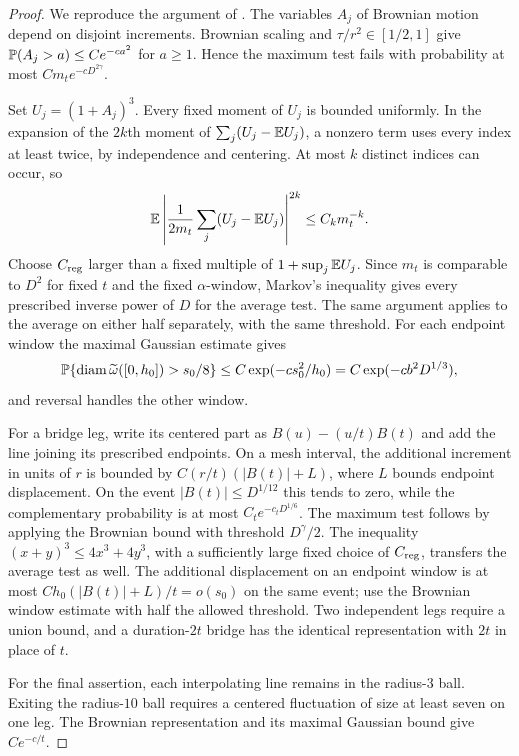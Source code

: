 \begin{proof}
We reproduce the argument of \citet[Lemma ``Free cutoff
bounds'']{HS}.  The variables $A_j$ of Brownian motion depend
on disjoint increments.  Brownian scaling and
$\tau/r^2\in[1/2,1]$ give
$\mathbb P(A_j>a)\le Ce^{-ca^2}$ for $a\ge1$.
Hence the maximum test fails with probability at most
$C m_t e^{-cD^{2\gamma}}$.

Set $U_j=(1+A_j)^3$.  Every fixed moment of $U_j$ is bounded
uniformly.  In the expansion of the $2k$th moment of
$\sum_j(U_j-\mathbb E U_j)$, a nonzero term uses every index at
least twice, by independence and centering.  At most $k$
distinct indices can occur, so
\[
 \mathbb E\left|\frac1{2m_t}\sum_j(U_j-\mathbb E U_j)\right|^{2k}
 \le C_k m_t^{-k}.
\]
Choose $C_{\rm reg}$ larger than a fixed multiple of
$1+\sup_j\mathbb E U_j$.  Since $m_t$ is comparable to $D^2$
for fixed $t$ and the fixed $\alpha$-window, Markov's
inequality gives every prescribed inverse power of $D$ for
the average test.  The same argument applies to the average
on either half separately, with the same threshold.
For each endpoint window the maximal Gaussian estimate gives
\[
 \mathbb P\{\operatorname{diam}\widetilde\omega([0,h_0])>s_0/8\}
 \le C\exp(-c s_0^2/h_0)
 =C\exp(-c b^2D^{1/3}),
\]
and reversal handles the other window.

For a bridge leg, write its centered part as
$B(u)-(u/t)B(t)$ and add the line joining its prescribed
endpoints.  On a mesh interval, the additional increment in
units of $r$ is bounded by
$C(r/t)(|B(t)|+L)$, where $L$ bounds endpoint displacement.
On the event $|B(t)|\le D^{1/12}$ this tends to zero,
while the complementary probability is at most
$C_t e^{-c_tD^{1/6}}$.  The maximum test follows by applying
the Brownian bound with threshold $D^\gamma/2$.
The inequality $(x+y)^3\le4x^3+4y^3$, with a sufficiently
large fixed choice of $C_{\rm reg}$, transfers the average
test as well.  The additional displacement on an endpoint
window is at most $C h_0(|B(t)|+L)/t=o(s_0)$ on the same
event; use the Brownian window estimate with half the allowed
threshold.  Two independent legs require a union bound, and
a duration-$2t$ bridge has the identical representation with
$2t$ in place of $t$.

For the final assertion, each interpolating line remains in
the radius-$3$ ball.  Exiting the radius-$10$ ball requires
a centered fluctuation of size at least seven on one leg.
The Brownian representation and its maximal Gaussian bound
give $Ce^{-c/t}$.
\end{proof}

